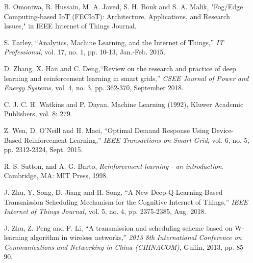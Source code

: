 \documentclass[journal]{IEEEtran}
\begin{document}

%
%
%
\begin{thebibliography}{1}

B. Omoniwa, R. Hussain, M. A. Javed, S. H. Bouk and S. A. Malik, "Fog/Edge Computing-based IoT (FECIoT): Architecture, Applications, and Research Issues," in IEEE Internet of Things Journal.

S. Earley, ``Analytics, Machine Learning, and the Internet of Things,'' \emph{IT Professional,} vol. 17, no. 1, pp. 10-13, Jan.-Feb. 2015.

D. Zhang, X. Han and C. Deng,``Review on the research and practice of deep learning and reinforcement learning in smart grids,'' \emph{CSEE Journal of Power and Energy Systems,} vol. 4, no. 3, pp. 362-370, September 2018.

C. J. C. H. Watkins and P. Dayan, Machine Learning (1992), Kluwer Academic Publishers, vol. 8: 279.

Z. Wen, D. O'Neill and H. Maei, ``Optimal Demand Response Using Device-Based Reinforcement Learning,'' \emph{IEEE Transactions on Smart Grid,} vol. 6, no. 5, pp. 2312-2324, Sept. 2015.

R. S. Sutton, and A. G. Barto, \emph{Reinforcement learning - an introduction.} Cambridge, MA: MIT Press, 1998.

J. Zhu, Y. Song, D. Jiang and H. Song, ``A New Deep-Q-Learning-Based Transmission Scheduling Mechanism for the Cognitive Internet of Things,'' \emph{IEEE Internet of Things Journal,} vol. 5, no. 4, pp. 2375-2385, Aug. 2018.

J. Zhu, Z. Peng and F. Li, ``A transmission and scheduling scheme based on W-learning algorithm in wireless networks,'' \emph{2013 8th International Conference on Communications and Networking in China (CHINACOM),} Guilin, 2013, pp. 85-90.


\end{thebibliography}
\end{document}
